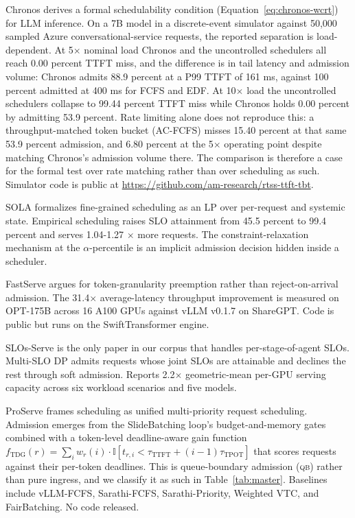 \documentclass[10pt]{article} %
\theoremstyle{definition}
\begin{document}
Chronos \citep{marref2026chronos} derives a formal schedulability
condition (Equation~\ref{eq:chronos-wcrt}) for LLM inference. On a 7B
model in a discrete-event simulator against 50{,}000 sampled Azure
conversational-service requests, the reported separation is
load-dependent. At 5$\times$ nominal load Chronos and the uncontrolled
schedulers all reach 0.00 percent TTFT miss, and the difference is in
tail latency and admission volume: Chronos admits 88.9 percent at a P99
TTFT of 161 ms, against 100 percent admitted at 400 ms for FCFS and
EDF. At 10$\times$ load the uncontrolled schedulers collapse to 99.44
percent TTFT miss while Chronos holds 0.00 percent by admitting 53.9
percent. Rate limiting alone does not reproduce this: a
throughput-matched token bucket (AC-FCFS) misses 15.40 percent at that
same 53.9 percent admission, and 6.80 percent at the 5$\times$
operating point despite matching Chronos's admission volume there. The
comparison is therefore a case for the formal test over rate matching
rather than over scheduling as such. Simulator code
is public at \url{https://github.com/am-research/rtss-ttft-tbt}.

SOLA \citep{hong2025sola} formalizes fine-grained scheduling as an LP
over per-request and systemic state. Empirical scheduling raises SLO
attainment from 45.5 percent to 99.4 percent and serves 1.04-1.27
$\times$ more requests. The constraint-relaxation mechanism at the
$\alpha$-percentile is an implicit admission decision hidden inside a
scheduler.

FastServe \citep{wu2026fastserve} argues for token-granularity
preemption rather than reject-on-arrival admission. The 31.4$\times$
average-latency throughput improvement is measured on OPT-175B across
16 A100 GPUs against vLLM v0.1.7 on ShareGPT. Code is public but runs
on the SwiftTransformer engine.

SLOs-Serve \citep{chen2025slosserve} is the only paper in our corpus
that handles per-stage-of-agent SLOs. Multi-SLO DP admits requests
whose joint SLOs are attainable and declines the rest through soft
admission. Reports 2.2$\times$ geometric-mean per-GPU serving capacity
across six workload scenarios and five models.

ProServe \citep{huang2025proserve} frames scheduling as unified
multi-priority request scheduling. Admission emerges from the
SlideBatching loop's budget-and-memory gates combined with a
token-level deadline-aware gain function
$f_{\text{TDG}}(r) = \sum_i w_r(i) \cdot
\mathbb{I}[t_{r,i} < \tau_{\text{TTFT}} + (i-1)\tau_{\text{TPOT}}]$
that scores requests against their per-token deadlines. This is
queue-boundary admission (\textsc{qb}) rather than pure ingress, and
we classify it as such in Table~\ref{tab:master}. Baselines include
vLLM-FCFS, Sarathi-FCFS, Sarathi-Priority, Weighted VTC, and
FairBatching. No code released.
\end{document}

